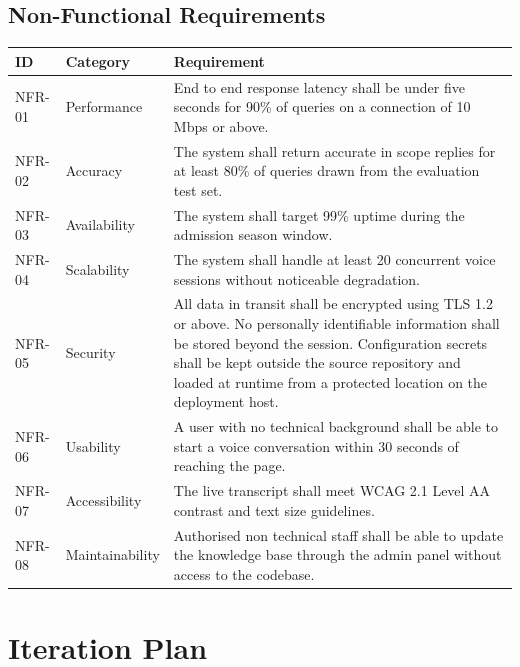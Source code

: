 \documentclass[12pt,a4paper]{report}
\begin{document}
\newpage
\subsection{Non-Functional Requirements}

\begin{longtable}{p{2cm} p{3.5cm} p{9cm}}
  \toprule
  \textbf{ID} & \textbf{Category}    & \textbf{Requirement} \\
  \midrule
  \endhead
  NFR-01 & Performance          & End to end response latency shall be under five seconds for 90\% of queries on a connection of 10 Mbps or above. \\[4pt]
  NFR-02 & Accuracy             & The system shall return accurate in scope replies for at least 80\% of queries drawn from the evaluation test set. \\[4pt]
  NFR-03 & Availability         & The system shall target 99\% uptime during the admission season window. \\[4pt]
  NFR-04 & Scalability          & The system shall handle at least 20 concurrent voice sessions without noticeable degradation. \\[4pt]
  NFR-05 & Security             & All data in transit shall be encrypted using TLS 1.2 or above. No personally identifiable information shall be stored beyond the session. Configuration secrets shall be kept outside the source repository and loaded at runtime from a protected location on the deployment host. \\[4pt]
  NFR-06 & Usability            & A user with no technical background shall be able to start a voice conversation within 30 seconds of reaching the page. \\[4pt]
  NFR-07 & Accessibility        & The live transcript shall meet WCAG 2.1 Level AA contrast and text size guidelines. \\[4pt]
  NFR-08 & Maintainability      & Authorised non technical staff shall be able to update the knowledge base through the admin panel without access to the codebase. \\[4pt]
  \bottomrule
\end{longtable}

\newpage
\section{Iteration Plan}
\end{document}
